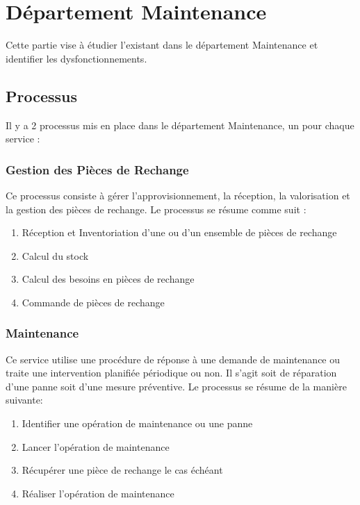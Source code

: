\documentclass[12pt]{article}
\begin{document}
\maketitle

\begin{abstract}
\end{abstract}

\section{Département Maintenance}
Cette partie vise à étudier l'existant dans le département Maintenance et
identifier les dysfonctionnements.

\subsection{Processus}
Il y a 2 processus mis en place dans le département Maintenance, un pour chaque
service :
\subsubsection{Gestion des Pièces de Rechange}
Ce processus consiste à gérer l'approvisionnement, la réception, la 
valorisation et la gestion des pièces de rechange.
Le processus se résume comme suit :
\begin{enumerate}
\item Réception et Inventoriation d'une ou d'un ensemble de pièces de rechange
\item Calcul du stock
\item Calcul des besoins en pièces de rechange
\item Commande de pièces de rechange
\end{enumerate}

\subsubsection{Maintenance}
Ce service utilise une procédure de réponse à une demande de maintenance ou
traite une intervention planifiée périodique ou non. Il s'agit soit de 
réparation d'une panne soit d'une mesure préventive.
Le processus se résume de la manière suivante:
\begin{enumerate}
\item Identifier une opération de maintenance ou une panne
\item Lancer l'opération de maintenance
\item Récupérer une pièce de rechange le cas échéant
\item Réaliser l'opération de maintenance
\end{enumerate}
\end{document}
